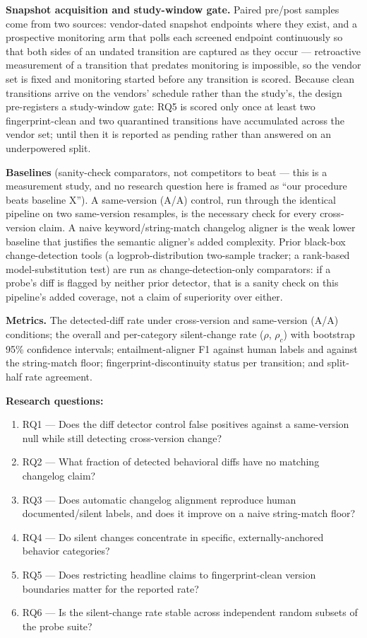 \documentclass[11pt]{article}
\begin{document}
\textbf{Snapshot acquisition and study-window gate.} Paired pre/post samples come from two sources: vendor-dated snapshot endpoints where they exist, and a prospective monitoring arm that polls each screened endpoint continuously so that both sides of an undated transition are captured as they occur --- retroactive measurement of a transition that predates monitoring is impossible, so the vendor set is fixed and monitoring started before any transition is scored. Because clean transitions arrive on the vendors' schedule rather than the study's, the design pre-registers a study-window gate: RQ5 is scored only once at least two fingerprint-clean and two quarantined transitions have accumulated across the vendor set; until then it is reported as pending rather than answered on an underpowered split.

\textbf{Baselines} (sanity-check comparators, not competitors to beat --- this is a measurement study, and no research question here is framed as ``our procedure beats baseline X''). A same-version (A/A) control, run through the identical pipeline on two same-version resamples, is the necessary check for every cross-version claim. A naive keyword/string-match changelog aligner is the weak lower baseline that justifies the semantic aligner's added complexity. Prior black-box change-detection tools (a logprob-distribution two-sample tracker; a rank-based model-substitution test) are run as change-detection-only comparators: if a probe's diff is flagged by neither prior detector, that is a sanity check on this pipeline's added coverage, not a claim of superiority over either.

\textbf{Metrics.} The detected-diff rate under cross-version and same-version (A/A) conditions; the overall and per-category silent-change rate ($\rho$, $\rho_c$) with bootstrap 95\% confidence intervals; entailment-aligner F1 against human labels and against the string-match floor; fingerprint-discontinuity status per transition; and split-half rate agreement.

\textbf{Research questions:}
\begin{enumerate}[leftmargin=1.6em]
\item RQ1 --- Does the diff detector control false positives against a same-version null while still detecting cross-version change?
\item RQ2 --- What fraction of detected behavioral diffs have no matching changelog claim?
\item RQ3 --- Does automatic changelog alignment reproduce human documented/silent labels, and does it improve on a naive string-match floor?
\item RQ4 --- Do silent changes concentrate in specific, externally-anchored behavior categories?
\item RQ5 --- Does restricting headline claims to fingerprint-clean version boundaries matter for the reported rate?
\item RQ6 --- Is the silent-change rate stable across independent random subsets of the probe suite?
\end{enumerate}
\end{document}
